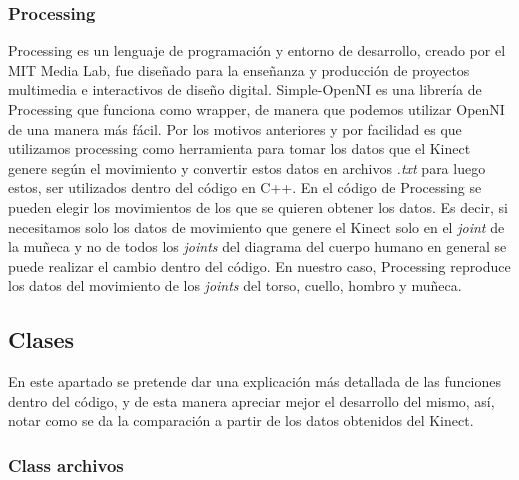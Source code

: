 \documentclass[letterpaper]{article}
\begin{document}
\subsubsection{Processing}

\quad \quad Processing es un lenguaje de programación y entorno de desarrollo, creado por el MIT Media Lab, fue diseñado para la enseñanza y producción de proyectos multimedia e interactivos de diseño digital. Simple-OpenNI es una librería de Processing que funciona como wrapper, de manera que podemos utilizar OpenNI de una manera más fácil. Por los motivos anteriores y por facilidad es que utilizamos processing como herramienta para tomar los datos que el Kinect genere según el movimiento y convertir estos datos en archivos \textit{.txt} para luego estos, ser utilizados dentro del código en C++. En el código de Processing se pueden elegir los movimientos de los que se quieren obtener los datos. Es decir, si necesitamos solo los datos de movimiento que genere el Kinect solo en el \textit{joint} de la muñeca y no de todos los \textit{joints} del diagrama del cuerpo humano en general se puede realizar el cambio dentro del código. En nuestro caso, Processing reproduce los datos del movimiento de los \textit{joints} del torso, cuello, hombro y muñeca.

\subsection{Clases}
\quad \quad En este apartado se pretende dar una explicación más detallada de las funciones dentro del código, y de esta manera apreciar mejor el desarrollo del mismo, así, notar como se da la comparación a partir de los datos 
obtenidos del Kinect. 

\subsubsection{Class archivos}
\end{document}
